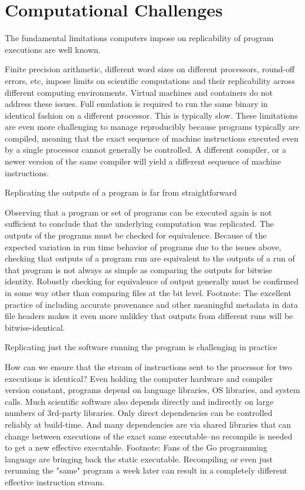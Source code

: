 \section{Computational Challenges}

		The fundamental limitations computers impose on replicability of program executions are well known.

			Finite precision arithmetic, different word sizes on different processors, round-off errors, etc, impose limits on scientific computations and
				their replicability across different computing environments.
			Virtual machines and containers do not address these issues. Full emulation is required to run the same binary in identical fashion
				on a different processor.  This is typically slow.
			These limitations are even more challenging to manage reproducibly because programs typically are compiled, meaning that the
				exact sequence of machine instructions executed even by a single processor cannot generally be controlled.  A different compiler,
				or a newer version of the same compiler will yield a different sequence of machine instructions.

		Replicating the outputs of a program is far from straightforward

			Observing that a program or set of programs can be executed again is not sufficient to conclude that the underlying computation
				was replicated.  The outputs of the programs must be checked for equivalence.
			Because of the expected variation in run time behavior of programs due to the issues above, checking that outputs of a program
				run are equivalent to the outputs of a run of that program is not always as simple as
				comparing the outputs for bitwise identity.
			Robustly checking for equivalence of output generally must be confirmed in some way other than comparing files at the bit level.
			Footnote: The excellent practice of including accurate provenance and other meaningful metadata in data file headers makes it
				even more unlikley that outputs from different runs will be bitwise-identical.

		Replicating just the software running the program is challenging in practice

			How can we ensure that the stream of instructions sent to the processor for two executions is identical?
			Even holding the computer hardware and compiler version constant, programs depend on language libraries, OS libraries, and system calls.
			Much scientific software also depends directly and indirectly on large numbers of 3rd-party libraries.
			Only direct dependencies can be controlled reliably at build-time.  And many dependencies are via shared libraries that can change between executions
				of the exact same executable--no recompile is needed to get a new effective executable.
			Footnote:  Fans of the Go programming language are bringing back the static executable.
			Recompiling or even just rerunning the "same" program a week later can result in a completely different effective instruction stream.

